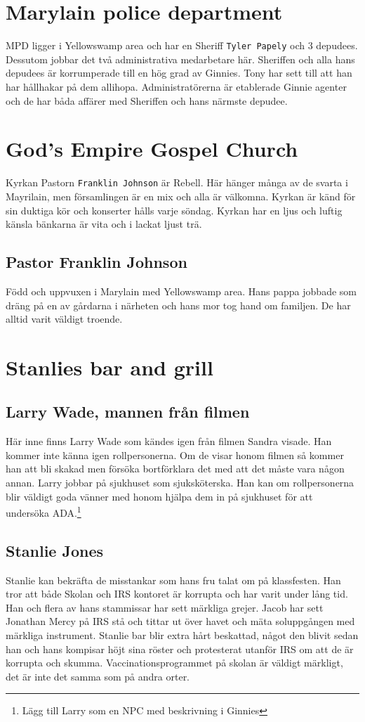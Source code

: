 \documentclass[a5paper,10pt]{report}
\begin{document}
\section{Marylain police department}
MPD ligger i Yellowswamp area och har en Sheriff \texttt{Tyler Papely} och 3 depudees. Dessutom jobbar det två administrativa medarbetare här. Sheriffen och alla hans depudees är korrumperade till en hög grad av Ginnies. Tony har sett till att han har hållhakar på dem allihopa. Administratörerna är etablerade Ginnie agenter och de har båda affärer med Sheriffen och hans närmste depudee.
\section{God's Empire Gospel Church}
Kyrkan Pastorn \texttt{Franklin Johnson} är Rebell. Här hänger många av de svarta i Mayrilain, men församlingen är en mix och alla är välkomna. Kyrkan är känd för sin duktiga kör och konserter hålls varje söndag. Kyrkan har en ljus och luftig känsla bänkarna är vita och i lackat ljust trä.
\subsection{Pastor Franklin Johnson}
Född och uppvuxen i Marylain med Yellowswamp area. Hans pappa jobbade som dräng på en av gårdarna i närheten och hans mor tog hand om familjen. De har alltid varit väldigt troende.

\section{Stanlies bar and grill}
\subsection{Larry Wade, mannen från filmen}
Här inne finns Larry Wade som kändes igen från filmen Sandra visade. Han kommer inte känna igen rollpersonerna. Om de visar honom filmen så kommer han att bli skakad men försöka bortförklara det med att det måste vara någon annan. Larry jobbar på sjukhuset som sjuksköterska. Han kan om rollpersonerna blir väldigt goda vänner med honom hjälpa dem in på sjukhuset för att undersöka ADA.\footnote{Lägg till Larry som en NPC med beskrivning i Ginnies}
\subsection{Stanlie Jones}
Stanlie kan bekräfta de misstankar som hans fru talat om på klassfesten. Han tror att både Skolan och IRS kontoret är korrupta och har varit under lång tid. Han och flera av hans stammissar har sett märkliga grejer. Jacob har sett Jonathan Mercy på IRS stå och tittar ut över havet och mäta soluppgången med märkliga instrument. Stanlie bar blir extra hårt beskattad, något den blivit sedan han och hans kompisar höjt sina röster och protesterat utanför IRS om att de är korrupta och skumma. Vaccinationsprogrammet på skolan är väldigt märkligt, det är inte det samma som på andra orter.
\end{document}
